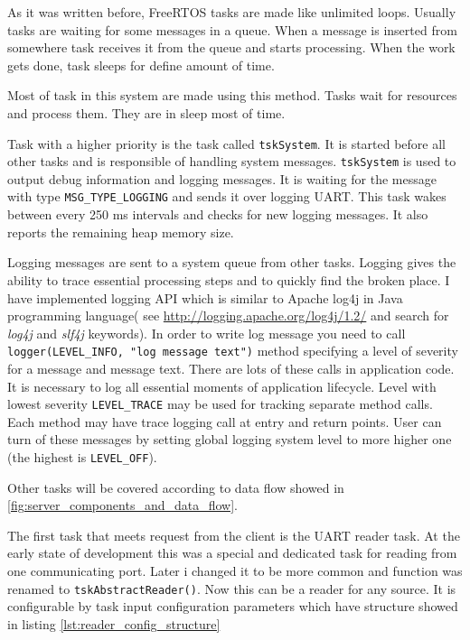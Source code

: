 As it was written before, FreeRTOS tasks are made like unlimited loops.
Usually tasks are waiting for some messages in a queue.
When a message is inserted from somewhere task receives it from the queue and
starts processing. When the work gets done,  task sleeps for define amount of
time. 

Most of task in this system are made using this method. 
Tasks wait for resources and process them. 
They are in sleep most of time.

Task with a higher priority is the task called  \texttt{tskSystem}.
It is started before all other tasks and is responsible of handling system
messages. 
\texttt{tskSystem} is used to output debug information and logging messages.
It is waiting for the message with type \texttt{MSG\_TYPE\_LOGGING} and sends it
over logging UART.
This task wakes between every 250 ms intervals and checks for new logging
messages. It also reports the remaining heap memory size.

Logging messages are sent to a system queue from other tasks.
Logging gives the ability to trace essential processing steps and to quickly
find the broken place.
I have implemented logging API which is similar to Apache log4j in Java
programming language( see \url{http://logging.apache.org/log4j/1.2/} and search
for \textit{log4j} and \textit{slf4j} keywords).
In order to write log message you need to call \texttt{logger(LEVEL\_INFO,
"log message text")} method specifying a level of severity for a message and
message text. There are  lots of these calls in application code. It is
necessary to log all essential moments of application lifecycle. Level with
lowest severity \texttt{LEVEL\_TRACE} may be used for tracking separate method
calls. Each method may have trace logging call at entry and return points.
User can turn of these messages by setting global logging system level to more
higher one (the highest is \texttt{LEVEL\_OFF}).

Other tasks will be covered according to data flow showed in
\autoref{fig:server_components_and_data_flow}.

The first task that meets request from the client is the UART reader task.
At the early state of development this was a special and dedicated task for
reading from one communicating port. Later i changed it to be more common and
function was renamed to \texttt{tskAbstractReader()}. Now this can be a
reader for any source. It is configurable by task input configuration parameters
which have structure showed in listing \ref{lst:reader_config_structure}


